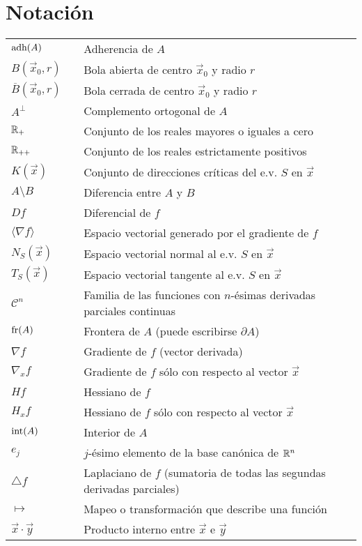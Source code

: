 \chapter*{Notaci\'on}

\pagestyle{plain}

\begin{tabular}{lll}
$\text{adh}({A})$   &   & Adherencia de $A$ \\   
$B(\vec{x}_0,r)$ 	&   & Bola abierta de centro $\vec{x}_0$ y radio $r$ \\
$\overline{B}(\vec{x}_0,r)$ &   & Bola cerrada de centro $\vec{x}_0$ y radio $r$ \\
$A^{\perp}$ &   & Complemento ortogonal de $A$ \\
$\mathbb{R}_+$		&   & Conjunto de los reales mayores o iguales a cero \\
$\mathbb{R}_{++}$ 	&   & Conjunto de los reales estrictamente  positivos \\    
$K(\vec{x})$ 		&   & Conjunto de direcciones cr\'iticas del e.v. $S$ en $\vec{x}$ \\	  
$A\setminus B$ &   & Diferencia entre $A$ y $B$ \\
$D f$ 		&   & Diferencial de $f$ \\ 	
$\langle\nabla f\rangle$ &   & Espacio vectorial generado por el gradiente de $f$ \\
$N_S(\vec{x})$	&   & Espacio vectorial normal al e.v. $S$ en $\vec{x}$ \\
$T_S(\vec{x})$    &   & Espacio vectorial tangente al e.v. $S$ en $\vec{x}$ \\
$\mathcal{C}^n$ &   & Familia de las funciones con $n$-\'esimas derivadas parciales continuas \\
$\text{fr}({A})$ 	&   & Frontera de $A$ (puede escribirse $\partial A$) \\
$\nabla f$	&   & Gradiente de $f$ (vector derivada) \\
$\nabla_x f$	&   & Gradiente de $f$ s\'olo con respecto al vector $\vec{x}$ \\
$H f$		&   & Hessiano de $f$ \\
$H_x f$		&   & Hessiano de $f$ s\'olo con respecto al vector $\vec{x}$	\\	 
$\text{int}({A})$ 	&   & Interior de $A$ \\
$e_j$		&   & $j$-\'esimo elemento de la base can\'onica de $\mathbb{R}^n$ \\
$\triangle f$ &   & Laplaciano de $f$ (sumatoria de todas las segundas derivadas parciales) \\
$\mapsto$  	&   & Mapeo o transformaci\'on que describe una funci\'on \\
$\vec{x}\cdot \vec{y}$ 	&   & Producto interno entre $\vec{x}$ e $\vec{y}$  
\end{tabular}